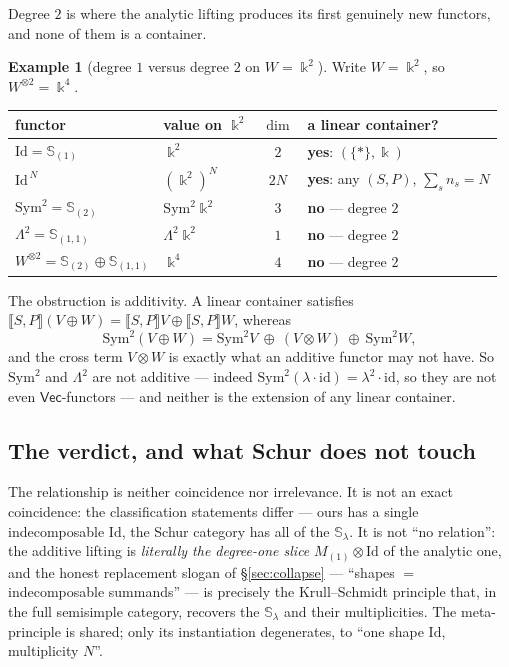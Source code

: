 \documentclass[11pt]{amsart}
\theoremstyle{plain}
\theoremstyle{definition}
\newtheorem{example}[theorem]{Example}
\renewcommand{\Vec}{\mathsf{Vec}}
\newcommand{\id}{\mathrm{id}}
\newcommand{\Id}{\mathrm{Id}}
\newcommand{\ext}[1]{\llbracket #1 \rrbracket}
\newcommand{\fld}{\Bbbk}
\begin{document}
Degree $2$ is where the analytic lifting produces its first genuinely new
functors, and none of them is a container.

\begin{example}[degree $1$ versus degree $2$ on $W=\fld^2$]\label{ex:schur}
Write $W=\fld^2$, so $W^{\otimes2}=\fld^4$.
\begin{center}\small
\renewcommand{\arraystretch}{1.3}
\begin{tabular}{@{}llcl@{}}
\hline
\textbf{functor} & \textbf{value on }$\fld^2$ & $\dim$ & \textbf{a linear container?}\\
\hline
$\Id=\mathbb S_{(1)}$ & $\fld^2$ & $2$ & \textbf{yes}: $(\{*\},\fld)$\\
$\Id^{\,N}$ & $(\fld^2)^N$ & $2N$ & \textbf{yes}: any $(S,P)$, $\sum_s n_s=N$\\
$\mathrm{Sym}^2=\mathbb S_{(2)}$ & $\mathrm{Sym}^2\fld^2$ & $3$ & \textbf{no} --- degree $2$\\
$\Lambda^2=\mathbb S_{(1,1)}$ & $\Lambda^2\fld^2$ & $1$ & \textbf{no} --- degree $2$\\
$W^{\otimes2}=\mathbb S_{(2)}\oplus\mathbb S_{(1,1)}$ & $\fld^4$ & $4$ & \textbf{no} --- degree $2$\\
\hline
\end{tabular}
\end{center}
The obstruction is additivity. A linear container satisfies
$\ext{S,P}(V\oplus W)=\ext{S,P}V\oplus\ext{S,P}W$, whereas
\[
  \mathrm{Sym}^2(V\oplus W)=\mathrm{Sym}^2V\ \oplus\ (V\otimes W)\ \oplus\ \mathrm{Sym}^2W,
\]
and the cross term $V\otimes W$ is exactly what an additive functor may not
have. So $\mathrm{Sym}^2$ and $\Lambda^2$ are not additive --- indeed
$\mathrm{Sym}^2(\lambda\cdot\id)=\lambda^2\cdot\id$, so they are not even
$\Vec$-functors --- and neither is the extension of any linear container.
\end{example}

\subsection{The verdict, and what Schur does not touch}

The relationship is neither coincidence nor irrelevance. It is not an exact
coincidence: the classification statements differ --- ours has a single
indecomposable $\Id$, the Schur category has all of the $\mathbb S_\lambda$. It
is not ``no relation'': the additive lifting is \emph{literally the degree-one
slice} $M_{(1)}\otimes\Id$ of the analytic one, and the honest replacement
slogan of \S\ref{sec:collapse} --- ``shapes $=$ indecomposable summands'' --- is
precisely the Krull--Schmidt principle that, in the full semisimple category,
recovers the $\mathbb S_\lambda$ and their multiplicities. The meta-principle is
shared; only its instantiation degenerates, to ``one shape $\Id$, multiplicity
$N$''.
\end{document}

